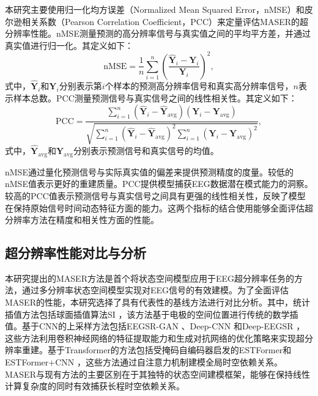 本研究主要使用归一化均方误差（Normalized Mean Squared Error，nMSE）和皮尔逊相关系数（Pearson Correlation Coefficient，PCC）来定量评估MASER的超分辨率性能。nMSE测量预测的高分辨率信号与真实值之间的平均平方差，并通过真实值进行归一化。其定义如下：
\begin{equation}
\text{nMSE} = \frac{1}{n} \sum_{i=1}^n \left( \frac{\hat{\mathbf{Y}}_i - \mathbf{Y}_i}{\mathbf{Y}_i} \right)^2,
\end{equation}
式中，$\hat{\mathbf{Y}}_i$和$\mathbf{Y}_i$分别表示第$i$个样本的预测高分辨率信号和真实高分辨率信号，$n$表示样本总数。PCC测量预测信号与真实信号之间的线性相关性。其定义如下：
\begin{equation}
\text{PCC} = \frac{\sum_{i=1}^n (\hat{\mathbf{Y}}_i - \hat{\mathbf{Y}}_{\text{avg}})(\mathbf{Y}_i - \mathbf{Y}_{\text{avg}})}{\sqrt{\sum_{i=1}^n (\hat{\mathbf{Y}}_i - \hat{\mathbf{Y}}_{\text{avg}})^2 \sum_{i=1}^n (\mathbf{Y}_i - \mathbf{Y}_{\text{avg}})^2}},
\end{equation}
式中，$\hat{\mathbf{Y}}_{\text{avg}}$和$\mathbf{Y}_{\text{avg}}$分别表示预测信号和真实信号的均值。

nMSE通过量化预测信号与实际真实值的偏差来提供预测精度的度量。较低的nMSE值表示更好的重建质量。PCC提供模型捕获EEG数据潜在模式能力的洞察。较高的PCC值表示预测信号与真实信号之间具有更强的线性相关性，反映了模型在保持原始信号时间动态特征方面的能力。这两个指标的结合使用能够全面评估超分辨率方法在精度和相关性方面的性能。

\subsection{超分辨率性能对比与分析}
本研究提出的MASER方法是首个将状态空间模型应用于EEG超分辨率任务的方法，通过多分辨率状态空间模型实现对EEG信号的有效建模。为了全面评估MASER的性能，本研究选择了具有代表性的基线方法进行对比分析。其中，统计插值方法包括球面插值算法SI \cite{freeden1984spherical}，该方法基于电极的空间位置进行传统的数学插值。基于CNN的上采样方法包括EEGSR-GAN \cite{corley2018deep}、Deep-CNN \cite{han2018feasibility}和Deep-EEGSR \cite{tang2022deep}，这些方法利用卷积神经网络的特征提取能力和生成对抗网络的优化策略来实现超分辨率重建。基于Transformer的方法包括受掩码自编码器启发的ESTFormer和ESTFormer+CNN \cite{li2023estformer}，这些方法通过自注意力机制建模全局时空依赖关系。MASER与现有方法的主要区别在于其独特的状态空间建模框架，能够在保持线性计算复杂度的同时有效捕获长程时空依赖关系。

